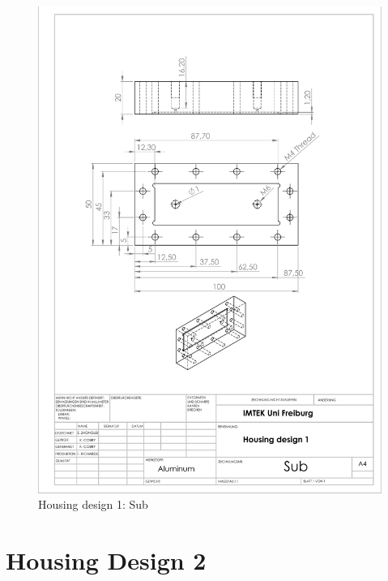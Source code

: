 \begin{figure}[h]%
\centering
\includegraphics[width=1\textwidth]{figures/appendix/housingdesign1sub}%
\caption{Housing design 1: Sub}%
\label{housingdesign1}%
\end{figure}

\clearpage

\section{Housing Design 2}

